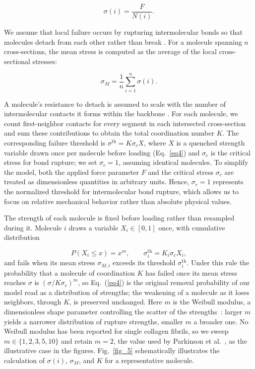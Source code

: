 \documentclass[aps,physrev,preprint,groupedaddress,linenumbers]{revtex4-2}
\begin{document}
\begin{equation}
	\sigma(i) = \dfrac{F}{N(i)}.
	\label{eq2}
\end{equation}

We assume that local failure occurs by rupturing intermolecular bonds so that molecules detach from each other rather than break \cite{Parkinson1997}. For a molecule spanning $n$ cross-sections, the mean stress is computed as the average of the local cross-sectional stresses:

\begin{equation}
	\sigma_{M} = \dfrac{1}{n}\sum_{i=1}^{n} \sigma(i).
	\label{eq3}
\end{equation}

A molecule's resistance to detach is assumed to scale with the number of intermolecular contacts it forms within the backbone \cite{Vater1979}. For each molecule, we count first-neighbor contacts for every segment in each intersected cross-section and sum these contributions to obtain the total coordination number $K$. The corresponding failure threshold is $\sigma^{\mathrm{th}} = K\sigma_c X$, where $X$ is a quenched strength variable drawn once per molecule before loading (Eq.~\ref{eq4}) and $\sigma_c$ is the critical stress for bond rupture; we set $\sigma_c = 1$, assuming identical molecules. To simplify the model, both the applied force parameter $F$ and the critical stress $\sigma_c$ are treated as dimensionless quantities in arbitrary units. Hence, $\sigma_c = 1$ represents the normalized threshold for intermolecular bond rupture, which allows us to focus on relative mechanical behavior rather than absolute physical values.

The strength of each molecule is fixed before loading rather than resampled during it. Molecule $i$ draws a variable $X_i \in [0,1]$ once, with cumulative distribution

\begin{equation}
	P(X_i \le x) = x^{m}, \qquad \sigma^{\mathrm{th}}_{i} = K_i \sigma_c X_i,
	\label{eq4}
\end{equation}
and fails when its mean stress $\sigma_{M,i}$ exceeds its threshold $\sigma^{\mathrm{th}}_{i}$. Under this rule the probability that a molecule of coordination $K$ has failed once its mean stress reaches $\sigma$ is $(\sigma/K\sigma_c)^{m}$, so Eq.~(\ref{eq4}) is the original removal probability of our model read as a distribution of strengths; the weakening of a molecule as it loses neighbors, through $K$, is preserved unchanged. Here $m$ is the Weibull modulus, a dimensionless shape parameter controlling the scatter of the strengths~\cite{Parkinson1997,Jones2012}: larger $m$ yields a narrower distribution of rupture strengths, smaller $m$ a broader one. No Weibull modulus has been reported for single collagen fibrils, so we sweep $m \in \{1,2,3,5,10\}$ and retain $m = 2$, the value used by Parkinson et al.~\cite{Parkinson1997}, as the illustrative case in the figures. Fig.~\ref{fig_5} schematically illustrates the calculation of $\sigma(i)$, $\sigma_{M}$, and $K$ for a representative molecule.
\end{document}
